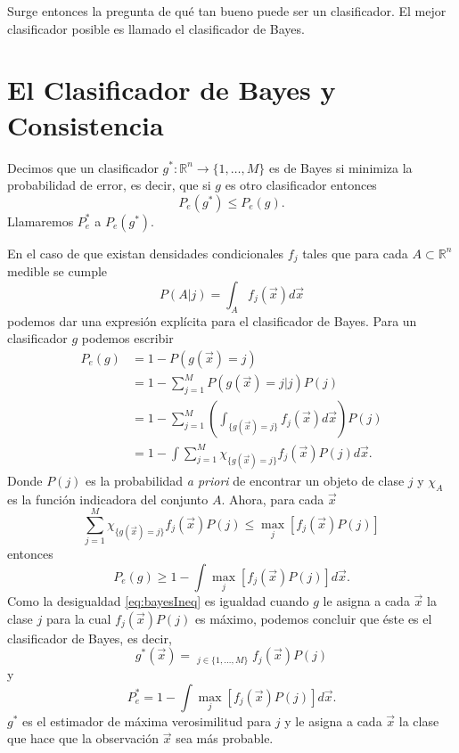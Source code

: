 \documentclass[letterpaper,12pt]{book}
\DeclareMathOperator*{\argmax}{arg\,m\acute{a}x}
\begin{document}
Surge entonces la pregunta de qué tan bueno puede ser un clasificador. El mejor clasificador posible es llamado el clasificador de Bayes.

\section{El Clasificador de Bayes y Consistencia}

Decimos que un clasificador $g^*:\mathbb{R}^n\rightarrow \{1, \dots, M\}$ es de Bayes si minimiza la probabilidad de error, es decir, que si $g$ es otro clasificador entonces
\begin{equation}
P_e(g^*) \leq P_e(g).
\end{equation}
Llamaremos $P_{e}^{*}$ a  $P_e(g^*)$.

En el caso de que existan densidades condicionales $f_j$ tales que para cada $A\subset \mathbb{R}^n$ medible se cumple
\begin{equation}
P(A|j) =\int_{A}f_{j}(\vec{x})d\vec{x}
\end{equation}
podemos dar una expresión explícita para el clasificador de Bayes. Para un clasificador $g$ podemos escribir
\begin{equation}
  \begin{aligned}
    P_e(g) &= 1-P(g(\vec{x}) =  j)\\
    & = 1-\sum_{j=1}^{M} P(g(\vec{x}) = j|j)P(j)\\
    & = 1-\sum_{j=1}^{M}\left( \int_{\{g(\vec{x})=j\}}f_j(\vec{x})  d\vec{x} \right) P(j)\\
    & = 1 - \int \sum_{j=1}^{M} \chi_{\{g(\vec{x})=j\}}f_j(\vec{x})P(j)d\vec{x}.
  \end{aligned}
\end{equation}
Donde $P(j)$ es la probabilidad \textit{a priori} de encontrar un objeto de clase $j$ y $\chi_A$ es la función indicadora del conjunto $A$. Ahora, para cada $\vec{x}$ 
\begin{equation}\label{eq:bayesIneq}
\sum_{j=1}^{M}\chi_{\{g(\vec{x})=j\}}f_j(\vec{x})P(j) \leq \max_j[f_j(\vec{x})P(j)]
\end{equation}
entonces
\begin{equation}
P_e(g)\geq 1-\int \max_j[f_j(\vec{x})P(j)] d\vec{x}.
\end{equation}
Como la desigualdad \ref{eq:bayesIneq} es igualdad cuando $g$ le asigna a cada $\vec{x}$ la clase $j$ para la cual $f_j(\vec{x})P(j)$ es máximo, podemos concluir que éste es el clasificador de Bayes, es decir,
\begin{equation}\label{eq:clasificadorBayes}
  g^*(\vec{x}) = \argmax_{j\in\{1,\dots,M\}}f_j(\vec{x})P(j)
\end{equation}
y
\begin{equation}
  P_e^* = 1-\int \max_j[f_j(\vec{x})P(j)] d\vec{x}.
\end{equation}
$g^*$ es el estimador de máxima verosimilitud para $j$ y le asigna a cada $\vec{x}$ la clase que hace que la observación $\vec{x}$ sea más probable.
\end{document}
